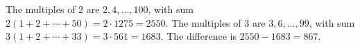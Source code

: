 The multiples of $2$ are $2,4,\dots,100$, with sum $2(1+2+\cdots+50)=2\cdot1275=2550$. The multiples of $3$ are $3,6,\dots,99$, with sum $3(1+2+\cdots+33)=3\cdot561=1683$. The difference is $2550-1683=\boxed{867}$.
